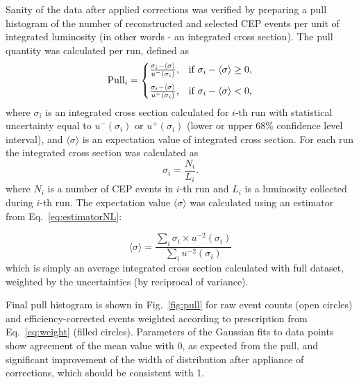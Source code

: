 Sanity of the data after applied corrections was verified by preparing a pull histogram of the number of reconstructed and selected CEP events per unit of integrated luminosity (in other words - an integrated cross section). The pull quantity was calculated per run, defined as 
\begin{equation}\label{eq:pull}
  \text{Pull}_{i}=\left\{
  \begin{array}{@{}ll@{}}
    \frac{\sigma_{i}-\langle \sigma\rangle}{u^{-}(\sigma_{i})}, & \text{if}\ \sigma_{i}-\langle \sigma\rangle \geq 0, \\[8pt]
    \frac{\sigma_{i}-\langle \sigma\rangle}{u^{+}(\sigma_{i})}, & \text{if}\ \sigma_{i}-\langle \sigma\rangle < 0,
  \end{array}\right.
\end{equation}
where $\sigma_{i}$ is an integrated cross section calculated for $i$-th run with statistical uncertainty equal to $u^{-}(\sigma_{i})$ or $u^{+}(\sigma_{i})$ (lower or upper 68\% confidence level interval), and $\langle \sigma\rangle$ is an expectation value of integrated cross section. For each run the integrated cross section was calculated as
\begin{equation}\label{eq:crossSecPull}
 \sigma_{i} = \frac{N_{i}}{L_{i}}.
\end{equation}
where $N_{i}$ is a number of CEP events in $i$-th run and $L_{i}$ is a luminosity collected during $i$-th run. The expectation value $\langle \sigma\rangle$ was calculated using an estimator from Eq.~\eqref{eq:estimatorNL}:

\begin{equation}\label{eq:estimatorNL}
 \langle \sigma\rangle = \frac{\sum\limits_{i}\sigma_{i} \times u^{-2}(\sigma_{i})}{\sum\limits_{i}u^{-2}(\sigma_{i})}
\end{equation}
which is simply an average integrated cross section calculated with full dataset, weighted by the uncertainties (by reciprocal of variance).

Final pull histogram is shown in Fig.~\ref{fig:pull} for raw event counts (open circles) and efficiency-corrected events weighted according to prescription from Eq.~\eqref{eq:weight} (filled circles). Parameters of the Gaussian fits to data points show agreement of the mean value with 0, as expected from the pull, and significant improvement of the width of distribution after appliance of corrections, which should be consistent with 1.


